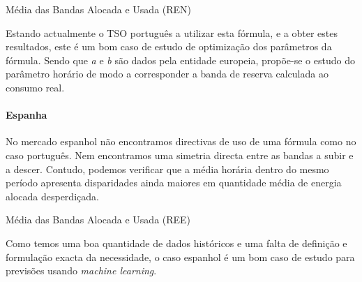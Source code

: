 \begin{table}[H]
	\centering
    \caption{Média das Bandas Alocada e Usada (REN)}    
    \resizebox{!}{!}{}
    \label{tab:media_bandas_pt}
    \end{table}

Estando actualmente o \gls{TSO} português a utilizar esta fórmula, e a obter estes resultados, este é um bom caso de estudo de optimização dos parâmetros da fórmula. Sendo que \textit{a} e \textit{b} são dados pela entidade europeia, propõe-se o estudo do parâmetro horário de modo a corresponder a banda de reserva calculada ao consumo real.\par

\paragraph{Espanha \label{se:prev_espanha}}
\text{ }  \par

No mercado espanhol não encontramos directivas de uso de uma fórmula como no caso português. Nem encontramos uma simetria directa entre as bandas a subir e a descer. Contudo, podemos verificar que a média horária dentro do mesmo período apresenta disparidades ainda maiores em quantidade média de energia alocada desperdiçada.\par

\begin{table}[H]
	\centering
    \caption{Média das Bandas Alocada e Usada (REE)}    
    \resizebox{!}{!}{}
    \label{tab:media_bandas_es}
    \end{table}


Como temos uma boa quantidade de dados históricos e uma falta de definição e formulação exacta da necessidade, o caso espanhol é um bom caso de estudo para previsões usando \textit{machine learning}.\par


